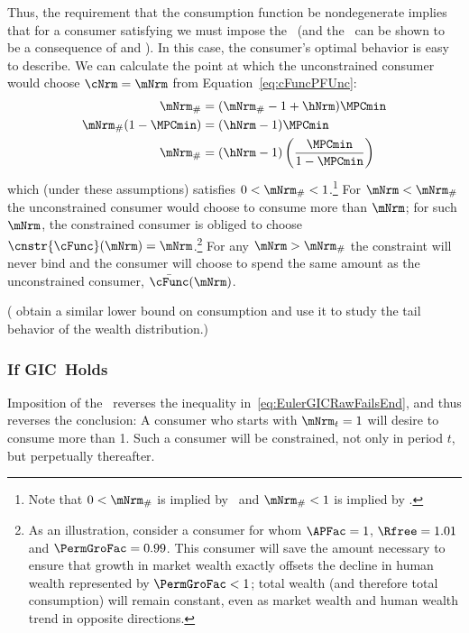 \documentclass[\econtexRoot/BufferStockTheory]{subfiles}
\begin{document}
Thus, the requirement that the consumption function be nondegenerate
implies that for a consumer satisfying \cncl{\GICRaw} we must impose
the \RIC~(and the \FHWC~can be shown to be a consequence of \cncl{\GICRaw} and \RIC).
In
this case, the consumer's optimal behavior is easy to describe.
We
can calculate the point at which the unconstrained consumer would
choose $\cNrm = \mNrm$ from Equation~\eqref{eq:cFuncPFUnc}:
\begin{equation}\begin{gathered}\begin{aligned}
  \mNrm_{\#}  & = (\mNrm_{\#}-1+\hNrm)\MPCmin
  \\ \mNrm_{\#}(1-\MPCmin)  & = (\hNrm - 1)\MPCmin
  \\ \mNrm_{\#}  & = (\hNrm - 1)\left(\frac{\MPCmin}{1-\MPCmin}\right)
\end{aligned}\end{gathered}\end{equation}
which (under these assumptions) satisfies $0 < \mNrm_{\#} < 1$.\footnote{Note that $0 < \mNrm_{\#}$ is implied by \RIC~and $ \mNrm_{\#}<1$ is implied by \cncl{\GICRaw}.}
For
$\mNrm < \mNrm_{\#}$ the unconstrained consumer would choose to
consume more than $\mNrm$; for such $\mNrm$, the constrained consumer
is obliged to choose $\cnstr{\cFunc}(\mNrm) = \mNrm$.\footnote{As an
  illustration, consider a consumer for whom $\APFac = 1$, $\Rfree
  =1.01$ and $\PermGroFac = 0.99$.
This consumer will save the amount
  necessary to ensure that growth in market wealth exactly offsets the
  decline in human wealth represented by $\PermGroFac < 1$; total wealth
  (and therefore total consumption) will remain constant, even as
  market wealth and human wealth trend in opposite directions.}
For
any $\mNrm > \mNrm_{\#}$ the constraint will never bind and the
consumer will choose to spend the same amount as the unconstrained
consumer, $\bar{\cFunc}(\mNrm)$.

(\cite{StachurskiToda2019JET} obtain a similar lower bound on consumption and use it to study the tail behavior of the wealth distribution.)


\subsubsection{If {GIC}~Holds}

Imposition of the \GICRaw~reverses the inequality in~\eqref{eq:EulerGICRawFailsEnd}, and thus reverses the conclusion: A consumer who starts with $\mNrm_{t}=1$ will desire to consume more than 1.
Such a consumer will be constrained, not only in period $t$, but perpetually thereafter.
\end{document}

